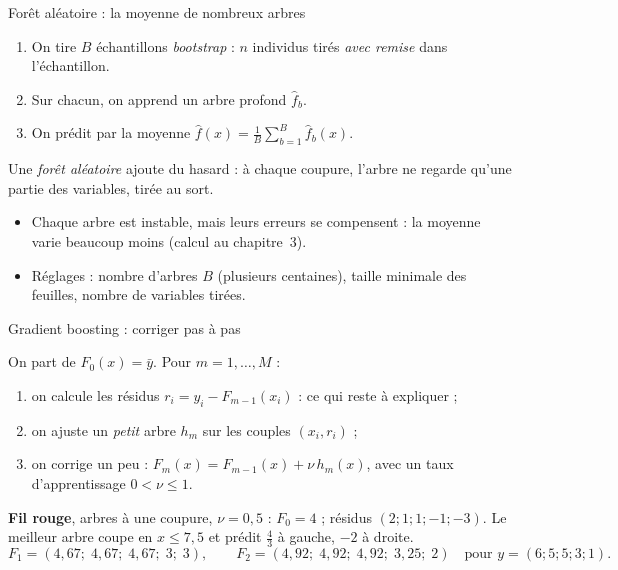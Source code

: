 \documentclass[aspectratio=169,11pt]{beamer}
\begin{document}
\begin{frame}{Forêt aléatoire : la moyenne de nombreux arbres}
  \begin{definition}
    \begin{enumerate}\setlength\itemsep{1pt}
      \item On tire $B$ échantillons \emph{bootstrap} : $n$ individus tirés \emph{avec remise} dans l'échantillon.
      \item Sur chacun, on apprend un arbre profond $\hat f_b$.
      \item On prédit par la moyenne $\hat f(x)=\frac1B\sum_{b=1}^B\hat f_b(x)$.
    \end{enumerate}
    Une \emph{forêt aléatoire} ajoute du hasard : à chaque coupure, l'arbre ne regarde qu'une partie des variables, tirée au sort.
  \end{definition}
  \begin{itemize}\small
    \item Chaque arbre est instable, mais leurs erreurs se compensent : la moyenne varie beaucoup moins (calcul au chapitre~3).
    \item Réglages : nombre d'arbres $B$ (plusieurs centaines), taille minimale des feuilles, nombre de variables tirées.
  \end{itemize}
\end{frame}

\begin{frame}{Gradient boosting : corriger pas à pas}
  \begin{definition}
    On part de $F_0(x)=\bar y$. Pour $m=1,\dots,M$ :
    \begin{enumerate}\setlength\itemsep{1pt}
      \item on calcule les résidus $r_i=y_i-F_{m-1}(x_i)$ : ce qui reste à expliquer ;
      \item on ajuste un \emph{petit} arbre $h_m$ sur les couples $(x_i,r_i)$ ;
      \item on corrige un peu : $F_m(x)=F_{m-1}(x)+\nu\,h_m(x)$, avec un taux d'apprentissage $0<\nu\le1$.
    \end{enumerate}
  \end{definition}
  \small
  \textbf{Fil rouge}, arbres à une coupure, $\nu=0{,}5$ : $F_0=4$ ; résidus $(2;1;1;-1;-3)$.
  Le meilleur arbre coupe en $x\le7{,}5$ et prédit $\frac43$ à gauche, $-2$ à droite.
  \[
    F_1=(4{,}67;\;4{,}67;\;4{,}67;\;3;\;3),\qquad F_2=(4{,}92;\;4{,}92;\;4{,}92;\;3{,}25;\;2)\quad\text{pour }y=(6;5;5;3;1).
  \]
\end{frame}
\end{document}
